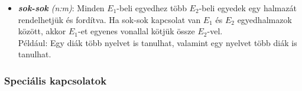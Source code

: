 \documentclass[tikz,12pt,margin=0px]{article}
\begin{document}
\begin{itemize}
        \item \emph{\textbf{sok-sok} (n:m)}: Minden $E_1$-beli egyedhez több $E_2$-beli egyedek egy halmazát rendelhetjük és fordítva. Ha sok-sok kapcsolat van $E_1$ és $E_2$ egyedhalmazok között, akkor $E_1$-et egyenes vonallal kötjük össze $E_2$-vel.\\
            {\small Például: Egy diák több nyelvet is tanulhat, valamint egy nyelvet több diák is tanulhat.}
        \begin{center}
        \end{center}
        \end{itemize}

    \subsubsection*{Speciális kapcsolatok}
\end{document}
